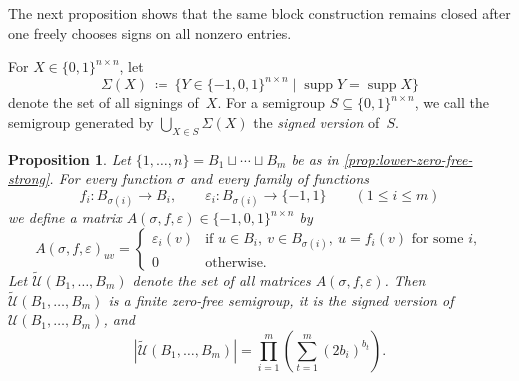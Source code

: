 \documentclass{lmcs}
\newtheorem{proposition}[thm]{Proposition}
\theoremstyle{definition}
\DeclareMathOperator{\supp}{supp}
\newcommand{\U}{\mathcal{U}}
\begin{document}
The next proposition shows that the same block construction remains closed after one freely chooses signs on all nonzero entries.

For $X \in \{0,1\}^{n \times n}$, let
\[
  \Sigma(X)
  \ \coloneqq \ 
  \{Y \in \{-1,0,1\}^{n \times n} \mid \supp Y = \supp X\}
\]
denote the set of all signings of~$X$.
For a semigroup $S \subseteq \{0,1\}^{n \times n}$, we call the semigroup generated by $\bigcup_{X \in S} \Sigma(X)$ the \emph{signed version} of~$S$.

\begin{proposition}\label{prop:lower-zero-free-signed-family}
Let $\{1,\ldots,n\} = B_1 \sqcup \cdots \sqcup B_m$ be as in \cref{prop:lower-zero-free-strong}. For every function $\sigma$ and every family of functions
\[
  f_i : B_{\sigma(i)} \to B_i,
  \qquad
  \varepsilon_i : B_{\sigma(i)} \to \{-1,1\}
  \qquad (1 \le i \le m)
\]
we define a matrix $A(\sigma,f,\varepsilon) \in \{-1,0,1\}^{n \times n}$ by
\[
  A(\sigma,f,\varepsilon)_{u v}
  =
  \begin{cases}
    \varepsilon_i(v) &\text{if } u \in B_i,\ v \in B_{\sigma(i)},\ u = f_i(v) \text{ for some } i,\\
    0 &\text{otherwise.}
  \end{cases}
\]
Let $\widetilde{\U}(B_1,\ldots,B_m)$ denote the set of all matrices $A(\sigma,f,\varepsilon)$. Then $\widetilde{\U}(B_1,\ldots,B_m)$ is a finite zero-free semigroup, it is the signed version of $\U(B_1,\ldots,B_m)$, and
\[
  |\widetilde{\U}(B_1,\ldots,B_m)|
  =
  \prod_{i=1}^m \left( \sum_{t=1}^m (2 b_i)^{b_t} \right).
\]
\end{proposition}
\end{document}
